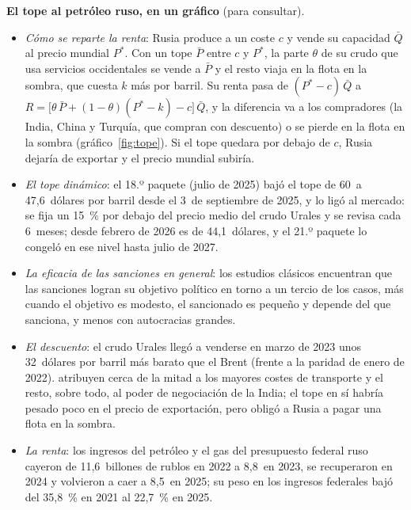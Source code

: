 \documentclass[11pt]{article}
\begin{document}
\begin{anotaciones}
\textbf{El tope al petróleo ruso, en un gráfico} (para consultar).
\begin{itemize}
\item \emph{Cómo se reparte la renta}: Rusia produce a un coste $c$ y vende su capacidad $\bar Q$ al precio mundial $P^*$. Con un tope $\bar P$ entre $c$ y $P^*$, la parte $\theta$ de su crudo que usa servicios occidentales se vende a $\bar P$ y el resto viaja en la flota en la sombra, que cuesta $k$ más por barril. Su renta pasa de $(P^*-c)\,\bar Q$ a $R=\big[\theta\,\bar P+(1-\theta)(P^*-k)-c\big]\,\bar Q$, y la diferencia va a los compradores (la India, China y Turquía, que compran con descuento) o se pierde en la flota en la sombra (gráfico~\ref{fig:tope}). Si el tope quedara por debajo de $c$, Rusia dejaría de exportar y el precio mundial subiría.
\end{itemize}
\begin{figuracaja}
\caption{El tope al precio del petróleo ruso}\label{fig:tope}
\end{figuracaja}
\begin{itemize}
\item \emph{El tope dinámico}: el 18.º paquete (julio de 2025) bajó el tope de 60~a 47,6~dólares por barril desde el 3~de septiembre de 2025, y lo ligó al mercado: se fija un 15~\% por debajo del precio medio del crudo Urales y se revisa cada 6~meses; desde febrero de 2026 es de 44,1~dólares, y el 21.º paquete lo congeló en ese nivel hasta julio de 2027\nocite{CE2026Paquete21}.
\item \emph{La eficacia de las sanciones en general}: los estudios clásicos encuentran que las sanciones logran su objetivo político en torno a un tercio de los casos, más cuando el objetivo es modesto, el sancionado es pequeño y depende del que sanciona, y menos con autocracias grandes\nocite{HufbauerEtAl2007,Pape1997}.
\item \emph{El descuento}: el crudo Urales llegó a venderse en marzo de 2023 unos 32~dólares por barril más barato que el Brent (frente a la paridad de enero de 2022). \textcite{KilianRapsonSchipper2025} atribuyen cerca de la mitad a los mayores costes de transporte y el resto, sobre todo, al poder de negociación de la India; el tope en sí habría pesado poco en el precio de exportación, pero obligó a Rusia a pagar una flota en la sombra.
\item \emph{La renta}: los ingresos del petróleo y el gas del presupuesto federal ruso cayeron de 11,6~billones de rublos en 2022 a 8,8~en 2023, se recuperaron en 2024 y volvieron a caer a 8,5~en 2025; su peso en los ingresos federales bajó del 35,8~\% en 2021 al 22,7~\% en 2025\nocite{MinfinRusia2026}.

\end{itemize}
\end{anotaciones}
\end{document}
